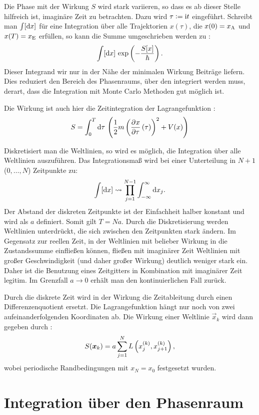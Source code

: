 Die Phase mit der Wirkung $S$ wird stark variieren, so dass es ab dieser Stelle
hilfreich ist, imaginäre Zeit zu betrachten. Dazu wird $\tau := \mathrm i t$
eingeführt. Schreibt man $\int [\dif x]$ für eine Integration über alle
Trajektorien $x(\tau)$, die $x(0) = x_\text A$ und $x(T) = x_\text E$ erfüllen,
so kann die Summe umgeschrieben werden zu
\parencite[(2.1)]{Creutz/Statistical_Approach_QM}:
\[
    \int [\dif x] \, \exp\del{-\frac{S[x]}\hbar}.
\]
Dieser Integrand wir nur in der Nähe der minimalen Wirkung Beiträge liefern.
Dies reduziert den Bereich des Phasenraums, über den integriert werden muss,
derart, dass die Integration mit Monte Carlo Methoden gut möglich ist.

Die Wirkung ist auch hier die Zeitintegration der Lagrangefunktion
\parencite[(2.5)]{Creutz/Statistical_Approach_QM}:
\[
    S = \int_0^T \dif \tau \, \del{\frac 12 m \del{\dpd x\tau(\tau)}^2 + V(x)}
\]

Diskretisiert man die Weltlinien, so wird es möglich, die Integration über alle
Weltlinien auszuführen. Das Integrationsmaß wird bei einer Unterteilung in
$N+1$ ($0, \ldots, N$)
Zeitpunkte zu:
\[
    \int [\dif x] \leadsto \prod_{j = 1}^{N-1} \int_{-\infty}^\infty \dif x_j.
\]
Der Abstand der diskreten Zeitpunkte ist der Einfachheit halber konstant und
wird als $a$ definiert. Somit gilt $T = Na$. Durch die Diskretisierung werden
Weltlinien unterdrückt, die sich zwischen den Zeitpunkten stark ändern. Im
Gegensatz zur reellen Zeit, in der Weltlinien mit belieber Wirkung in die
Zustandssumme einfließen können, fließen mit imaginärer Zeit Weltlinien mit
großer Geschwindigkeit (und daher großer Wirkung) deutlich weniger stark ein.
Daher ist die Benutzung eines Zeitgitters in Kombination mit imaginärer Zeit
legitim. Im Grenzfall $a \to 0$ erhält man den kontinuierlichen Fall zurück.

Durch die diskrete Zeit wird in der Wirkung die Zeitableitung durch einen
Differenzenquotient ersetzt. Die Lagrangefunktion hängt nur noch von zwei
aufeinanderfolgenden Koordinaten ab. Die Wirkung einer Weltlinie $\vec x_k$
wird dann gegeben durch
\parencite[(3.2)]{Creutz/Statistical_Approach_QM}:
\[
    S(\vec x_k) = a \sum_{j = 1}^N L\del{x_j^{(k)}, x_{j+1}^{(k)}},
\]
wobei periodische Randbedingungen mit $x_{N} = x_0$ festgesetzt wurden.

\section{Integration über den Phasenraum}

